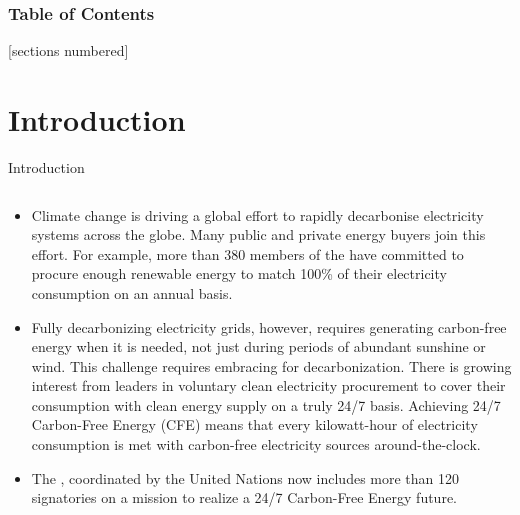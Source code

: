 \begin{frame}
  \frametitle{Table of Contents}
  [sections numbered]
  \tableofcontents[hideallsubsections]
\end{frame}



\section{Introduction}


\begin{frame}{Introduction}

  {\footnotesize
  \centering
  \begin{columns}[T]
  \begin{column}{9cm}
    \begin{itemize}
    \item Climate change is driving a global effort to \alert{rapidly decarbonise} 
    electricity systems across the globe. Many public and private energy buyers join this effort. For example, more than 380 members of the  have committed to procure enough renewable energy to match 100\% of their electricity consumption on an annual basis.

    \item Fully decarbonizing electricity grids, however, requires generating carbon-free energy when it is needed, not just during periods of abundant sunshine or wind. This challenge requires embracing  for decarbonization. 
    There is growing interest from leaders in voluntary clean  electricity procurement to cover their consumption with clean energy supply on a \alert{truly 24/7 basis}.  Achieving 24/7 Carbon-Free Energy (CFE) means that every kilowatt-hour of electricity consumption is met
    with carbon-free electricity sources around-the-clock.

    \item The , coordinated by the United Nations now includes more than 120 signatories on a mission to realize a 24/7 Carbon-Free Energy future. 

    \end{itemize}
    \end{column}


\end{columns}}
\end{frame}
